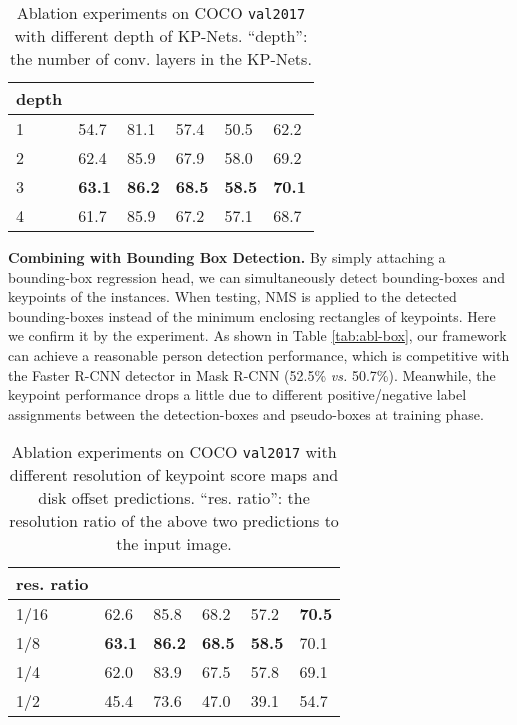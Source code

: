\documentclass[sigconf]{acmart}
\begin{document}
\begin{table}
\renewcommand{\arraystretch}{1.2}
  \caption{Ablation experiments on COCO \texttt{val2017} with different depth of KP-Nets. ``depth'': the number of conv. layers in the KP-Nets.}
  \label{tab:abl-depth}
  \begin{tabular}{p{45 pt}<{\centering}p{25 pt}<{\centering}p{25 pt}<{\centering}p{25 pt}<{\centering}p{25 pt}<{\centering}p{25 pt}<{\centering}}
    \toprule
    depth &  &  &  &  &  \\
    \midrule
    1 & 54.7 & 81.1 & 57.4 & 50.5 & 62.2 \\
    2 & 62.4 & 85.9 & 67.9 & 58.0 & 69.2 \\
    3 & \textbf{63.1} & \textbf{86.2} & \textbf{68.5} & \textbf{58.5} & \textbf{70.1} \\
    4 & 61.7 & 85.9 & 67.2 & 57.1 & 68.7 \\
  \bottomrule
\end{tabular}
\end{table}


\textbf{Combining with Bounding Box Detection.}\quad
By simply attaching a bounding-box regression head, we can simultaneously detect bounding-boxes and keypoints of the instances.
When testing, NMS is applied to the detected bounding-boxes instead of the minimum enclosing rectangles of keypoints. Here we confirm it by the experiment. As shown in Table \ref{tab:abl-box}, our framework can achieve a reasonable person detection performance, which is competitive with the Faster R-CNN detector in Mask R-CNN \cite{he2017mask} (52.5\% \textit{vs.} 50.7\%). Meanwhile, the keypoint performance drops a little due to different positive/negative label assignments between the detection-boxes and pseudo-boxes at training phase.



\begin{table}
\renewcommand{\arraystretch}{1.2}
  \caption{Ablation experiments on COCO \texttt{val2017} with different resolution of keypoint score maps and disk offset predictions. ``res. ratio'': the resolution ratio of the above two predictions to the input image.}
  \label{tab:abl-res}
  \begin{tabular}{p{45 pt}<{\centering}p{25 pt}<{\centering}p{25 pt}<{\centering}p{25 pt}<{\centering}p{25 pt}<{\centering}p{25 pt}<{\centering}}
    \toprule
    res. ratio &  &  &  &  &  \\
    \midrule
    1/16 & 62.6 & 85.8 & 68.2 & 57.2 & \textbf{70.5} \\
    1/8 & \textbf{63.1} & \textbf{86.2} & \textbf{68.5} & \textbf{58.5} & 70.1 \\
    1/4 & 62.0 & 83.9 & 67.5 & 57.8 & 69.1 \\
    1/2 & 45.4 & 73.6 & 47.0 & 39.1 & 54.7 \\
  \bottomrule
\end{tabular}
\end{table}
\end{document}
